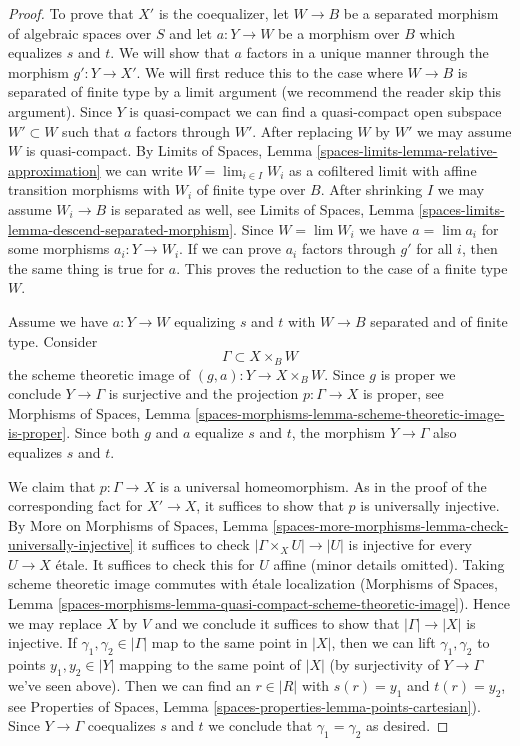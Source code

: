 \begin{proof}
\medskip\noindent
To prove that $X'$ is the coequalizer, let $W \to B$ be a separated morphism
of algebraic spaces over $S$ and let $a : Y \to W$ be a morphism over $B$
which equalizes $s$ and $t$. We will show that $a$ factors in a unique manner
through the morphism $g' : Y \to X'$. We will first reduce this to the
case where $W \to B$ is separated of finite type by a limit argument
(we recommend the reader skip this argument). Since $Y$ is quasi-compact
we can find a quasi-compact open subspace $W' \subset W$ such that $a$
factors through $W'$. After replacing $W$ by $W'$ we may assume $W$ is
quasi-compact. By Limits of Spaces, Lemma
\ref{spaces-limits-lemma-relative-approximation}
we can write $W = \lim_{i \in I} W_i$ as a cofiltered limit with
affine transition morphisms with $W_i$ of finite type over $B$. After
shrinking $I$ we may assume $W_i \to B$ is separated as well, see
Limits of Spaces, Lemma \ref{spaces-limits-lemma-descend-separated-morphism}.
Since $W = \lim W_i$ we have $a = \lim a_i$ for some morphisms
$a_i : Y \to W_i$. If we can prove $a_i$ factors through $g'$
for all $i$, then the same thing is true for $a$.
This proves the reduction to the case of a finite type $W$.

\medskip\noindent
Assume we have $a : Y \to W$ equalizing $s$ and $t$ with $W \to B$ separated
and of finite type. Consider
$$
\Gamma \subset X \times_B W
$$
the scheme theoretic image of $(g, a) : Y \to X \times_B W$.
Since $g$ is proper we conclude $Y \to \Gamma$ is surjective and
the projection $p : \Gamma \to X$ is proper, see
Morphisms of Spaces, Lemma
\ref{spaces-morphisms-lemma-scheme-theoretic-image-is-proper}.
Since both $g$ and $a$ equalize $s$ and $t$, the morphism $Y \to \Gamma$
also equalizes $s$ and $t$.

\medskip\noindent
We claim that $p : \Gamma \to X$ is a universal homeomorphism.
As in the proof of the corresponding fact for $X' \to X$, it
suffices to show that $p$ is universally injective. By
More on Morphisms of Spaces, Lemma
\ref{spaces-more-morphisms-lemma-check-universally-injective}
it suffices to check $|\Gamma \times_X U| \to |U|$ is injective
for every $U \to X$ \'etale. It suffices to check this for
$U$ affine (minor details omitted). Taking scheme
theoretic image commutes with \'etale localization
(Morphisms of Spaces, Lemma
\ref{spaces-morphisms-lemma-quasi-compact-scheme-theoretic-image}).
Hence we may replace $X$ by $V$ and we conclude it suffices
to show that $|\Gamma| \to |X|$ is injective.
If $\gamma_1, \gamma_2 \in |\Gamma|$ map to the same point in $|X|$, then
we can lift $\gamma_1, \gamma_2$ to points $y_1, y_2 \in |Y|$ mapping to the
same point of $|X|$ (by surjectivity of $Y \to \Gamma$ we've seen above).
Then we can find an $r \in |R|$ with $s(r) = y_1$ and $t(r) = y_2$, see
Properties of Spaces, Lemma \ref{spaces-properties-lemma-points-cartesian}).
Since $Y \to \Gamma$ coequalizes $s$ and $t$ we conclude that
$\gamma_1 = \gamma_2$ as desired.


\end{proof}
